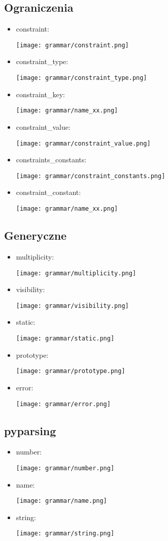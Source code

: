 \subsection{Ograniczenia}
\begin{itemize}
\item constraint:

\texttt{[image: grammar/constraint.png]}

\item constraint\_type:

\texttt{[image: grammar/constraint\_type.png]}

\item constraint\_key:

\texttt{[image: grammar/name\_xx.png]}

\item constraint\_value:

\texttt{[image: grammar/constraint\_value.png]}

\item constraints\_constants:

\texttt{[image: grammar/constraint\_constants.png]}

\item constraint\_constant:

\texttt{[image: grammar/name\_xx.png]}
\end{itemize}
\subsection{Generyczne}
\begin{itemize}
\item multiplicity:

\texttt{[image: grammar/multiplicity.png]}

\item visibility:

\texttt{[image: grammar/visibility.png]}

\item static:

\texttt{[image: grammar/static.png]}

\item prototype:

\texttt{[image: grammar/prototype.png]}

\item error:

\texttt{[image: grammar/error.png]}
\end{itemize}
\subsection{pyparsing}
\begin{itemize}
\item number:

\texttt{[image: grammar/number.png]}

\item name:

\texttt{[image: grammar/name.png]}

\item string:

\texttt{[image: grammar/string.png]}
\end{itemize}